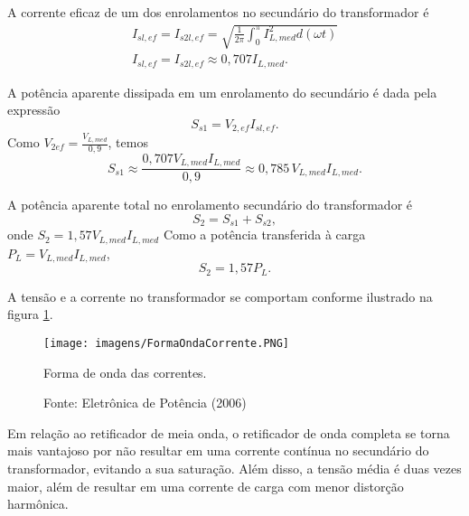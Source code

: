 A corrente eficaz de um dos enrolamentos no secundário do transformador é
\begin{align*}
I_{sl,ef} = I_{s2l,ef} = \sqrt{ \frac{1}{2\pi}{\int_{0}^{\pi}}I_{L,med}^2{d(\omega{t})}} \\
I_{sl,ef} = I_{s2l,ef} \approx 0,707 I_{L,med} 
.\end{align*}


A potência aparente dissipada em um enrolamento do secundário é dada pela expressão \[
S_{s1} = V_{2,ef}I_{sl,ef}
.\] Como $V_{2ef} = \frac{V_{L,med}}{0,9}$, temos \[
S_{s1} \approx \frac{0,707 V_{L,med}I_{L,med}}{0,9} \approx 0,785 \,V_{L,med}I_{L,med}
.\] 

A potência aparente total no enrolamento secundário do transformador é \[
 S_{2} = S_{s1} + S_{s2}
,\] onde $S_{2} = 1,57 V_{L,med}I_{L,med}$
 Como a potência transferida à carga $P_{L} = V_{L,med}I_{L,med}$, \[
S_{2}= 1,57 P_{L}
.\] 

A tensão e a corrente no transformador se comportam conforme ilustrado na figura \ref{fig:FOC}.

\begin{figure}[ht]
\center
\texttt{[image: imagens/FormaOndaCorrente.PNG]}
\caption{Forma de onda das correntes.}\label{fig:FOC}
\caption*{Fonte: Eletrônica de Potência (2006)}
\end{figure}

Em relação ao retificador de meia onda, o retificador de onda completa se torna mais vantajoso por não resultar em uma corrente contínua no secundário do transformador, evitando a sua saturação. Além disso, a tensão média é duas vezes maior, além de resultar em uma corrente de carga com menor distorção harmônica.

